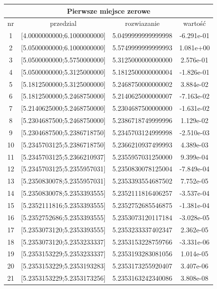 \documentclass[11pt, oneside]{article}   	%
\begin{document}
\begin{center}
\begin{tabular}{ |c|c|c|c| } 
\hline
\multicolumn{4}{|c|}{Pierwsze miejsce zerowe} \\
 \hline
 nr & przedzial & rozwiazanie & wartość \\
 \hline
1 & [4.0000000000;6.1000000000] & 5.0499999999999998 &   -6.291e-01 \\ 
  2 & [5.0500000000;6.1000000000] & 5.5749999999999993 &    1.081e+00 \\ 
  3 & [5.0500000000;5.5750000000] & 5.3125000000000000 &    2.576e-01 \\ 
  4 & [5.0500000000;5.3125000000] & 5.1812500000000004 &   -1.826e-01 \\ 
  5 & [5.1812500000;5.3125000000] & 5.2468750000000002 &    3.884e-02 \\ 
  6 & [5.1812500000;5.2468750000] & 5.2140625000000007 &   -7.163e-02 \\ 
  7 & [5.2140625000;5.2468750000] & 5.2304687500000000 &   -1.631e-02 \\ 
  8 & [5.2304687500;5.2468750000] & 5.2386718749999996 &    1.129e-02 \\ 
  9 & [5.2304687500;5.2386718750] & 5.2345703124999998 &   -2.510e-03 \\ 
 10 & [5.2345703125;5.2386718750] & 5.2366210937499993 &    4.389e-03 \\ 
 11 & [5.2345703125;5.2366210937] & 5.2355957031250000 &    9.399e-04 \\ 
 12 & [5.2345703125;5.2355957031] & 5.2350830078125004 &   -7.849e-04 \\ 
 13 & [5.2350830078;5.2355957031] & 5.2353393554687502 &    7.752e-05 \\ 
 14 & [5.2350830078;5.2353393555] & 5.2352111816406257 &   -3.537e-04 \\ 
 15 & [5.2352111816;5.2353393555] & 5.2352752685546875 &   -1.381e-04 \\ 
 16 & [5.2352752686;5.2353393555] & 5.2353073120117184 &   -3.028e-05 \\ 
 17 & [5.2353073120;5.2353393555] & 5.2353233337402347 &    2.362e-05 \\ 
 18 & [5.2353073120;5.2353233337] & 5.2353153228759766 &   -3.331e-06 \\ 
 19 & [5.2353153229;5.2353233337] & 5.2353193283081056 &    1.014e-05 \\ 
 20 & [5.2353153229;5.2353193283] & 5.2353173255920407 &    3.407e-06 \\ 
 21 & [5.2353153229;5.2353173256] & 5.2353163242340086 &    3.808e-08 \\ 

\end{tabular}
\end{center}
\end{document}
